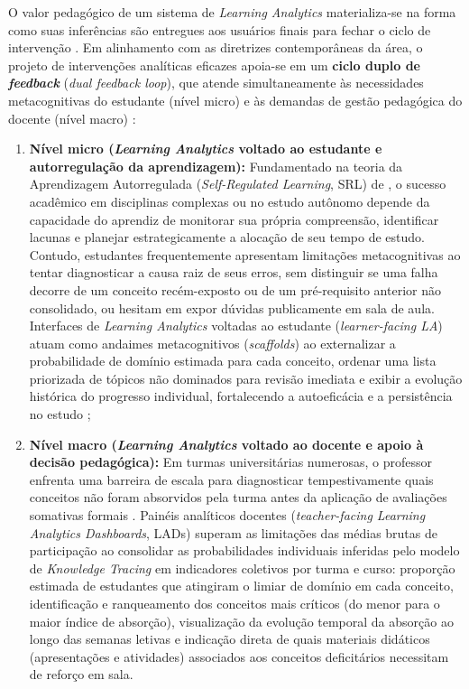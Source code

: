 O valor pedagógico de um sistema de \textit{Learning Analytics} materializa-se na forma como suas inferências são entregues aos usuários finais para fechar o ciclo de intervenção \cite{clow_learning_2012, verbert_learning_2014}. Em alinhamento com as diretrizes contemporâneas da área, o projeto de intervenções analíticas eficazes apoia-se em um \textbf{ciclo duplo de \textit{feedback}} (\textit{dual feedback loop}), que atende simultaneamente às necessidades metacognitivas do estudante (nível micro) e às demandas de gestão pedagógica do docente (nível macro) \cite{gaevic_learning_2015, liao_naviedu_2026}:

\begin{enumerate}
    \item \textbf{Nível micro (\textit{Learning Analytics} voltado ao estudante e autorregulação da aprendizagem):} Fundamentado na teoria da Aprendizagem Autorregulada (\textit{Self-Regulated Learning}, SRL) de , o sucesso acadêmico em disciplinas complexas ou no estudo autônomo depende da capacidade do aprendiz de monitorar sua própria compreensão, identificar lacunas e planejar estrategicamente a alocação de seu tempo de estudo. Contudo, estudantes frequentemente apresentam limitações metacognitivas ao tentar diagnosticar a causa raiz de seus erros, sem distinguir se uma falha decorre de um conceito recém-exposto ou de um pré-requisito anterior não consolidado, ou hesitam em expor dúvidas publicamente em sala de aula. Interfaces de \textit{Learning Analytics} voltadas ao estudante (\textit{learner-facing LA}) atuam como andaimes metacognitivos (\textit{scaffolds}) ao externalizar a probabilidade de domínio estimada para cada conceito, ordenar uma lista priorizada de tópicos não dominados para revisão imediata e exibir a evolução histórica do progresso individual, fortalecendo a autoeficácia e a persistência no estudo \cite{verbert_learning_2014, cao_multi-granularity_2025};

    \item \textbf{Nível macro (\textit{Learning Analytics} voltado ao docente e apoio à decisão pedagógica):} Em turmas universitárias numerosas, o professor enfrenta uma barreira de escala para diagnosticar tempestivamente quais conceitos não foram absorvidos pela turma antes da aplicação de avaliações somativas formais \cite{verbert_learning_2014}. Painéis analíticos docentes (\textit{teacher-facing Learning Analytics Dashboards}, LADs) superam as limitações das médias brutas de participação ao consolidar as probabilidades individuais inferidas pelo modelo de \textit{Knowledge Tracing} em indicadores coletivos por turma e curso: proporção estimada de estudantes que atingiram o limiar de domínio em cada conceito, identificação e ranqueamento dos conceitos mais críticos (do menor para o maior índice de absorção), visualização da evolução temporal da absorção ao longo das semanas letivas e indicação direta de quais materiais didáticos (apresentações e atividades) associados aos conceitos deficitários necessitam de reforço em sala.
\end{enumerate}

